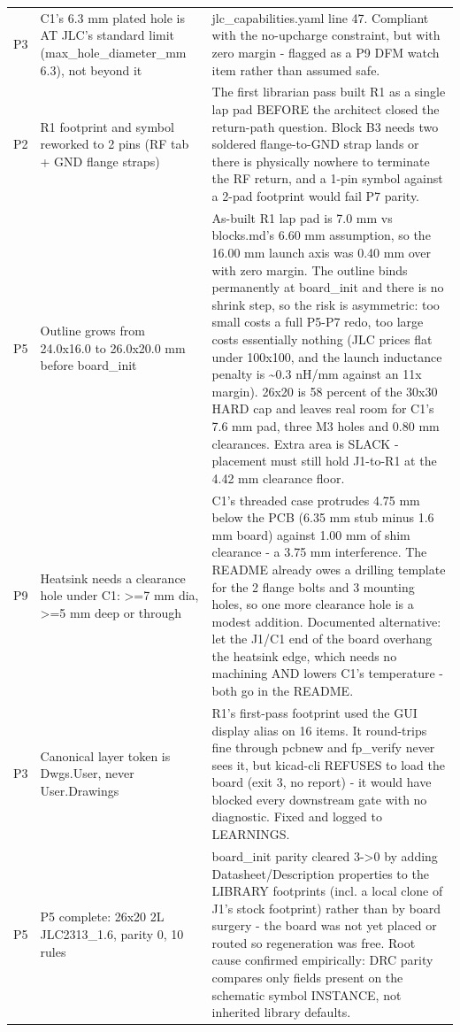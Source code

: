 \documentclass[11pt,a4paper]{article}
\begin{document}
{\begin{longtable}{lp{5.2cm}p{7.2cm}}
P3 & C1's 6.3 mm plated hole is AT JLC's standard limit (max\_hole\_diameter\_mm 6.3), not beyond it & jlc\_capabilities.yaml line 47. Compliant with the no-upcharge constraint, but with zero margin - flagged as a P9 DFM watch item rather than assumed safe. \\
P2 & R1 footprint and symbol reworked to 2 pins (RF tab + GND flange straps) & The first librarian pass built R1 as a single lap pad BEFORE the architect closed the return-path question. Block B3 needs two soldered flange-to-GND strap lands or there is physically nowhere to terminate the RF return, and a 1-pin symbol against a 2-pad footprint would fail P7 parity. \\
P5 & Outline grows from 24.0x16.0 to 26.0x20.0 mm before board\_init & As-built R1 lap pad is 7.0 mm vs blocks.md's 6.60 mm assumption, so the 16.00 mm launch axis was 0.40 mm over with zero margin. The outline binds permanently at board\_init and there is no shrink step, so the risk is asymmetric: too small costs a full P5-P7 redo, too large costs essentially nothing (JLC prices flat under 100x100, and the launch inductance penalty is \textasciitilde{}0.3 nH/mm against an 11x margin). 26x20 is 58 percent of the 30x30 HARD cap and leaves real room for C1's 7.6 mm pad, three M3 holes and 0.80 mm clearances. Extra area is SLACK - placement must still hold J1-to-R1 at the 4.42 mm clearance floor. \\
P9 & Heatsink needs a clearance hole under C1: \textgreater{}=7 mm dia, \textgreater{}=5 mm deep or through & C1's threaded case protrudes 4.75 mm below the PCB (6.35 mm stub minus 1.6 mm board) against 1.00 mm of shim clearance - a 3.75 mm interference. The README already owes a drilling template for the 2 flange bolts and 3 mounting holes, so one more clearance hole is a modest addition. Documented alternative: let the J1/C1 end of the board overhang the heatsink edge, which needs no machining AND lowers C1's temperature - both go in the README. \\
P3 & Canonical layer token is Dwgs.User, never User.Drawings & R1's first-pass footprint used the GUI display alias on 16 items. It round-trips fine through pcbnew and fp\_verify never sees it, but kicad-cli REFUSES to load the board (exit 3, no report) - it would have blocked every downstream gate with no diagnostic. Fixed and logged to LEARNINGS. \\
P5 & P5 complete: 26x20 2L JLC2313\_1.6, parity 0, 10 rules & board\_init parity cleared 3-\textgreater{}0 by adding Datasheet/Description properties to the LIBRARY footprints (incl. a local clone of J1's stock footprint) rather than by board surgery - the board was not yet placed or routed so regeneration was free. Root cause confirmed empirically: DRC parity compares only fields present on the schematic symbol INSTANCE, not inherited library defaults. \\

\end{longtable}}
\end{document}

